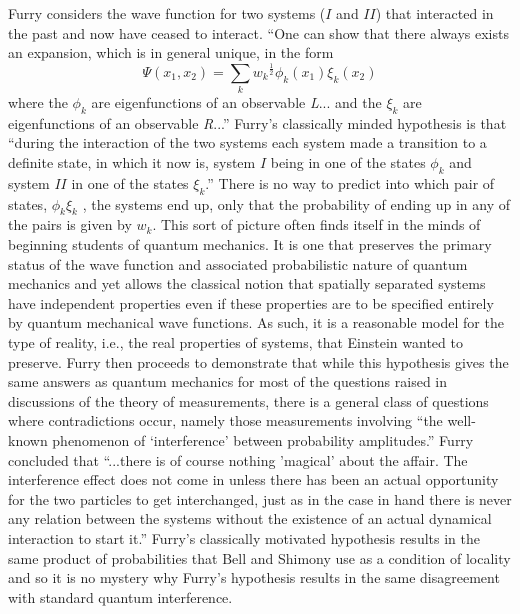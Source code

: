 \documentclass[12pt]{article}
\begin{document}
Furry\cite{Fur36a} considers the wave function for two systems ($I$ and $II$) that interacted in the past and now have ceased to interact.  ``One can show that there always exists an expansion, which is in general unique, in the form
\begin{equation}
\Psi(x_1,x_2) = \sum_k {w_k}^{\frac{1}{2}} \phi_k (x_1) \xi_k (x_2)
\end{equation}
where the $\phi_k$ are eigenfunctions of an observable {\it L}... and the $\xi_k$ are eigenfunctions of an observable {\it R}...''  Furry's classically minded hypothesis is that ``during the interaction of the two systems each system made a transition to a definite state, in which it now is, system $I$ being in one of the states $\phi_k$ and system $II$ in one of the states $\xi_k$.''  There is no way to predict into which pair of states, $\phi_k\xi_k$ , the systems end up, only that the probability of ending up in any of the pairs is given by $w_k$.  This sort of picture often finds itself in the minds of beginning students of quantum mechanics.  It is one that preserves the primary status of the wave function and associated probabilistic nature of quantum mechanics and yet allows the classical notion that spatially separated systems have independent properties even if these properties are to be specified entirely by quantum mechanical wave functions.  As such, it is a reasonable model for the type of reality, i.e., the real properties of systems, that Einstein wanted to preserve.  Furry then proceeds to demonstrate that while this hypothesis gives the same answers as quantum mechanics for most of the questions raised in discussions of the theory of measurements, there is a general class of questions where contradictions occur, namely those measurements involving ``the well-known phenomenon of `interference' between probability amplitudes.''  Furry concluded that ``...there is of course nothing 'magical' about the affair. The interference effect does not come in unless there has been an actual opportunity for the two particles to get interchanged, just as in the case in hand there is never any relation between the systems without the existence of an actual dynamical interaction to start it.''\cite{Fur36b}  Furry's classically motivated hypothesis results in the same product of probabilities that Bell and Shimony use as a condition of locality and so it is no mystery why Furry's hypothesis results in the same disagreement with standard quantum interference.
\end{document}
